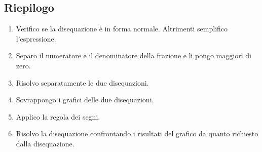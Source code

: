 \subsection{Riepilogo}
\begin{procedurat}{}{}
\begin{enumerate}
	\item Verifico se la disequazione è in forma normale. Altrimenti semplifico l'espressione.
	\item Separo il numeratore e il denominatore della frazione e li pongo maggiori di zero.
	\item Risolvo separatamente le due disequazioni.
	\item Sovrappongo i grafici delle due disequazioni.
	\item Applico la regola dei segni.
	\item Risolvo la disequazione confrontando i risultati del grafico da quanto richiesto dalla disequazione.
\end{enumerate}
\end{procedurat}
 


